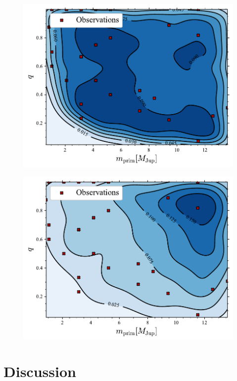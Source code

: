 \documentclass[aa]{lib/aa}
\begin{document}
\begin{figure}
    \centering
        \includegraphics[width=.91\columnwidth]{figures/mass_distr_Plummer_rvir0.5.pdf}
        \caption{}
         \label{Fig:Plummer_massfunction}
\end{figure}
\begin{figure}
    \centering
        \includegraphics[width=.91\columnwidth]{figures/mass_distr_Fractal_rvir0.5.pdf}
        \caption{}
         \label{Fig:fractal_massfunction}
\end{figure}



  


\section{Discussion}
\end{document}
